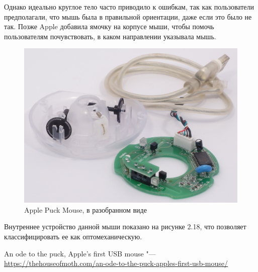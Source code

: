 \documentclass[11pt, a4paper]{article}
\begin{document}
Однако идеально круглое тело часто приводило к ошибкам, так как пользователи предполагали, что мышь была в правильной ориентации, даже если это было не так. Позже Apple добавила ямочку на корпусе мыши, чтобы помочь пользователям почувствовать, в каком направлении указывала мышь.
\begin{figure}[h]
    \centering
    \includegraphics[scale=0.3]{1998_apple_puck/apple2.jpg}
    \caption{Apple Puck Mouse, в разобранном виде}
    \label{fig:inside}
\end{figure}

Внутреннее устройство данной мыши показано на рисунке 2.18, что позволяет классифицировать  ее как оптомеханическую.

\begin{thebibliography}{9}

     An ode to the puck, Apple's first USB mouse "---
    \url{https://thehouseofmoth.com/an-ode-to-the-puck-apples-first-usb-mouse/}

\end{thebibliography}
\end{document}
